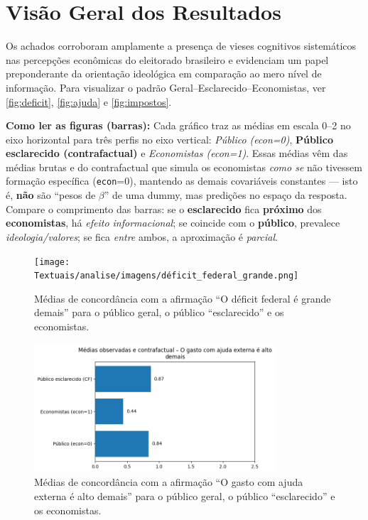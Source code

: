 \chapter{Visão Geral dos Resultados}
Os achados corroboram amplamente a presença de vieses cognitivos sistemáticos nas percepções econômicas do eleitorado brasileiro e evidenciam um papel preponderante da orientação ideológica em comparação ao mero nível de informação. Para visualizar o padrão Geral–Esclarecido–Economistas, ver \autoref{fig:deficit}, \autoref{fig:ajuda} e \autoref{fig:impostos}.

\textbf{Como ler as figuras (barras):} Cada gráfico traz as médias em escala 0–2 no eixo horizontal para três perfis no eixo vertical: \emph{Público (econ=0)}, \textbf{Público esclarecido (contrafactual)} e \emph{Economistas (econ=1)}. Essas médias vêm das médias brutas e do contrafactual que simula os economistas \emph{como se} não tivessem formação específica (\texttt{econ}=0), mantendo as demais covariáveis constantes — isto é, \textbf{não} são “pesos de $\beta$” de uma dummy, mas predições no espaço da resposta. Compare o comprimento das barras: se o \textbf{esclarecido} fica \textbf{próximo} dos \textbf{economistas}, há \emph{efeito informacional}; se coincide com o \textbf{público}, prevalece \emph{ideologia/valores}; se fica \emph{entre} ambos, a aproximação é \emph{parcial}.



\begin{figure}[htbp]
\centering
\texttt{[image: Textuais/analise/imagens/déficit\_federal\_grande.png]}
\caption{Médias de concordância com a afirmação ``O déficit federal é grande demais'' para o público geral, o público ``esclarecido'' e os economistas.}
\label{fig:deficit}
\end{figure}

\begin{figure}[htbp]
\centering
\includegraphics[width=0.8\textwidth]{Textuais/analise/imagens/gasto_ajuda_externa.png}
\caption{Médias de concordância com a afirmação ``O gasto com ajuda externa é alto demais'' para o público geral, o público ``esclarecido'' e os economistas.}
\label{fig:ajuda}
\end{figure}

